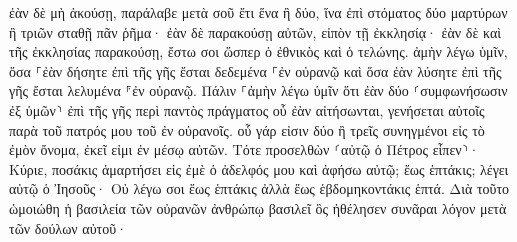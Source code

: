\documentclass{openreader}
\begin{document}
ἐὰν δὲ μὴ ἀκούσῃ, παράλαβε μετὰ σοῦ ἔτι ἕνα ἢ δύο, ἵνα ἐπὶ στόματος δύο μαρτύρων ἢ τριῶν σταθῇ πᾶν ῥῆμα· 
ἐὰν δὲ παρακούσῃ αὐτῶν, εἰπὸν τῇ ἐκκλησίᾳ· ἐὰν δὲ καὶ τῆς ἐκκλησίας παρακούσῃ, ἔστω σοι ὥσπερ ὁ ἐθνικὸς καὶ ὁ τελώνης. 
ἀμὴν λέγω ὑμῖν, ὅσα ⸀ἐὰν δήσητε ἐπὶ τῆς γῆς ἔσται δεδεμένα ⸀ἐν οὐρανῷ καὶ ὅσα ἐὰν λύσητε ἐπὶ τῆς γῆς ἔσται λελυμένα ⸁ἐν οὐρανῷ. 
Πάλιν ⸀ἀμὴν λέγω ὑμῖν ὅτι ἐὰν δύο ⸂συμφωνήσωσιν ἐξ ὑμῶν⸃ ἐπὶ τῆς γῆς περὶ παντὸς πράγματος οὗ ἐὰν αἰτήσωνται, γενήσεται αὐτοῖς παρὰ τοῦ πατρός μου τοῦ ἐν οὐρανοῖς. 
οὗ γάρ εἰσιν δύο ἢ τρεῖς συνηγμένοι εἰς τὸ ἐμὸν ὄνομα, ἐκεῖ εἰμι ἐν μέσῳ αὐτῶν. 
Τότε προσελθὼν ⸂αὐτῷ ὁ Πέτρος εἶπεν⸃· Κύριε, ποσάκις ἁμαρτήσει εἰς ἐμὲ ὁ ἀδελφός μου καὶ ἀφήσω αὐτῷ; ἕως ἑπτάκις; 
λέγει αὐτῷ ὁ Ἰησοῦς· Οὐ λέγω σοι ἕως ἑπτάκις ἀλλὰ ἕως ἑβδομηκοντάκις ἑπτά. 
Διὰ τοῦτο ὡμοιώθη ἡ βασιλεία τῶν οὐρανῶν ἀνθρώπῳ βασιλεῖ ὃς ἠθέλησεν συνᾶραι λόγον μετὰ τῶν δούλων αὐτοῦ· 
\end{document}
